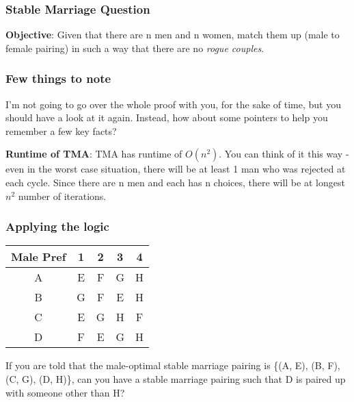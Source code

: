 \documentclass[9pt]{beamer}
\begin{document}
\begin{frame}[fragile]
  \frametitle{Stable Marriage Question}
  {\bf Objective}: Given that there are n men and n women, match them up (male to female pairing) in such a way that there are no {\it rogue couples}.\newline
  
\end{frame}
\begin{frame}[fragile]
\frametitle{Few things to note}
I'm not going to go over the whole proof with you, for the sake of time, but you should have a look at it again. Instead, how about some pointers to help you remember a few key facts?
\begin{enumerate}
 {
\item 
{\bf Runtime of TMA}: TMA has runtime of $O(n^2)$. You can think of it this way - even in the worst case situation, there will be at least 1 man who was rejected at each cycle. Since there are n men and each has n choices, there will be at longest $n^2$ number of iterations.
}
\end{enumerate}
\end{frame}

\begin{frame}[fragile]
\frametitle{Applying the logic}
\begin{tabular}{|c|c|c|c|c|}
\hline
Male Pref & 1 & 2 & 3 & 4\\
\hline
A & E & F & G & H\\
B & G & F & E & H\\
C & E & G & H & F\\
D & F & E & G & H\\
\hline
\end{tabular}\newline
If you are told that the male-optimal stable marriage pairing is \{(A, E), (B, F), (C, G), (D, H)\}, can you have a stable marriage pairing such that D is paired up with someone other than H?\\
\end{frame}
\end{document}
